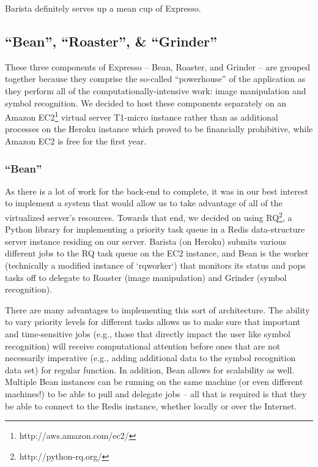 \documentclass{acm_proc_article-sp}
\begin{document}
Barista definitely serves up a mean cup of Expresso.

\subsection{``Bean'', ``Roaster'', \& ``Grinder''}
These three components of Expresso -- Bean, Roaster, and Grinder -- are grouped together because they comprise the so-called ``powerhouse'' of the application as they perform all of the computationally-intensive work: image manipulation and symbol recognition. We decided to host these components separately on an Amazon EC2\footnote{http://aws.amazon.com/ec2/} virtual server T1-micro instance rather than as  additional processes on the Heroku instance which proved to be financially prohibitive, while Amazon EC2 is free for the first year. 

\subsubsection{``Bean''}
As there is a lot of work for the back-end to complete, it was in our best interest to
implement a system that would allow us to take advantage of all of the virtualized server's resources. Towards that end, we decided on using RQ\footnote{http://python-rq.org/}, a Python library for implementing a priority task queue in a Redis data-structure server instance residing on our server. Barista (on Heroku) submits various different jobs to the RQ task queue on the EC2 instance, and Bean is the worker (technically a modified instance of `rqworker`) that monitors its status and pops tasks off to delegate to Roaster (image manipulation) and Grinder (symbol recognition).

There are many advantages to implementing this sort of architecture. The ability to vary priority levels for different tasks allows us to make sure that important and time-sensitive jobs (e.g., those that directly impact the user like symbol recognition) will receive computational attention before ones that are not necessarily imperative (e.g., adding additional data to the symbol recognition data set) for regular function. In addition, Bean allows for scalability as well. Multiple Bean instances can be running on the same machine (or even different machines!) to be able to pull and delegate jobs -- all that is required is that they be able to connect to the Redis instance, whether locally or over the Internet.

\label{subsection:roaster}
\end{document}
